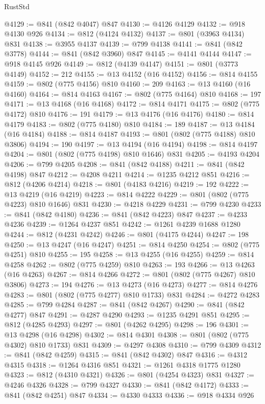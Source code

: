 \begin{lexlean}{RustStd}
\begin{coremodule}
{\begin{coremodule}
{{{{{@4129 := @841 (@842 @4047) @847
@4130 := @4126 @4129
@4132 := @918 @4130 @926
@4134 := @812 (@4124 @4132)
@4137 := @801 (@3963 @4134) @831
@4138 := @3955 @4137
@4139 := @799 @4138
@4141 := @841 (@842 @3778)
@4144 := @841 (@842 @3960) @847
@4145 := @4141 @4144
@4147 := @918 @4145 @926
@4149 := @812 (@4139 @4147)
@4151 := @801 (@3773 @4149)
@4152 := 212
@4155 := @13 @4152 (@16 @4152)
@4156 := @814 @4155
@4159 := @802 (@775 @4156) @810
@4160 := 209
@4163 := @13 @4160 (@16 @4160)
@4164 := @814 @4163
@4167 := @802 (@775 @4164) @810
@4168 := 197
@4171 := @13 @4168 (@16 @4168)
@4172 := @814 @4171
@4175 := @802 (@775 @4172) @810
@4176 := 191
@4179 := @13 @4176 (@16 @4176)
@4180 := @814 @4179
@4183 := @802 (@775 @4180) @810
@4184 := 189
@4187 := @13 @4184 (@16 @4184)
@4188 := @814 @4187
@4193 := @801 (@802 (@775 @4188) @810 @3806)
@4194 := 190
@4197 := @13 @4194 (@16 @4194)
@4198 := @814 @4197
@4204 := @801 (@802 (@775 @4198) @810 @1646) @831
@4205 := @4193 @4204
@4206 := @799 @4205
@4208 := @841 (@842 @4188)
@4211 := @841 (@842 @4198) @847
@4212 := @4208 @4211
@4214 := @1235 @4212 @851
@4216 := @812 (@4206 @4214)
@4218 := @801 (@4183 @4216)
@4219 := 192
@4222 := @13 @4219 (@16 @4219)
@4223 := @814 @4222
@4229 := @801 (@802 (@775 @4223) @810 @1646) @831
@4230 := @4218 @4229
@4231 := @799 @4230
@4233 := @841 (@842 @4180)
@4236 := @841 (@842 @4223) @847
@4237 := @4233 @4236
@4239 := @1264 @4237 @851
@4242 := @1261 @4239 @1688 @1280
@4244 := @812 (@4231 @4242)
@4246 := @801 (@4175 @4244)
@4247 := 198
@4250 := @13 @4247 (@16 @4247)
@4251 := @814 @4250
@4254 := @802 (@775 @4251) @810
@4255 := 195
@4258 := @13 @4255 (@16 @4255)
@4259 := @814 @4258
@4262 := @802 (@775 @4259) @810
@4263 := 193
@4266 := @13 @4263 (@16 @4263)
@4267 := @814 @4266
@4272 := @801 (@802 (@775 @4267) @810 @3806)
@4273 := 194
@4276 := @13 @4273 (@16 @4273)
@4277 := @814 @4276
@4283 := @801 (@802 (@775 @4277) @810 @1733) @831
@4284 := @4272 @4283
@4285 := @799 @4284
@4287 := @841 (@842 @4267)
@4290 := @841 (@842 @4277) @847
@4291 := @4287 @4290
@4293 := @1235 @4291 @851
@4295 := @812 (@4285 @4293)
@4297 := @801 (@4262 @4295)
@4298 := 196
@4301 := @13 @4298 (@16 @4298)
@4302 := @814 @4301
@4308 := @801 (@802 (@775 @4302) @810 @1733) @831
@4309 := @4297 @4308
@4310 := @799 @4309
@4312 := @841 (@842 @4259)
@4315 := @841 (@842 @4302) @847
@4316 := @4312 @4315
@4318 := @1264 @4316 @851
@4321 := @1261 @4318 @1775 @1280
@4323 := @812 (@4310 @4321)
@4326 := @801 (@4254 @4323) @831
@4327 := @4246 @4326
@4328 := @799 @4327
@4330 := @841 (@842 @4172)
@4333 := @841 (@842 @4251) @847
@4334 := @4330 @4333
@4336 := @918 @4334 @926
}}}}}
\end{coremodule}}
\end{coremodule}
\end{lexlean}

